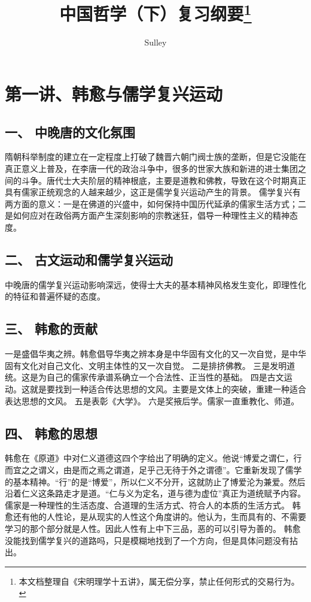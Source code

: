 \documentclass{article}
\title{\heiti 中国哲学（下）复习纲要\footnote{本文档整理自《宋明理学十五讲》，属无偿分享，禁止任何形式的交易行为。}}
\author{Sulley}
\date{}
\begin{document}
\maketitle
\tableofcontents
\newpage

\section{第一讲、韩愈与儒学复兴运动}
\subsection{一、	中晚唐的文化氛围}
隋朝科举制度的建立在一定程度上打破了魏晋六朝门阀士族的垄断，但是它没能在真正意义上普及，在李唐一代的政治斗争中，很多的世家大族和新进的进士集团之间的斗争。唐代士大夫阶层的精神根底，主要是道教和佛教，导致在这个时期真正具有儒家正统观念的人越来越少，这正是儒学复兴运动产生的背景。
儒学复兴有两方面的意义：一是在佛道的兴盛中，如何保持中国历代延承的儒家生活方式；二是如何应对在政俗两方面产生深刻影响的宗教迷狂，倡导一种理性主义的精神态度。
\subsection{二、	古文运动和儒学复兴运动}
中晚唐的儒学复兴运动影响深远，使得士大夫的基本精神风格发生变化，即理性化的特征和普遍怀疑的态度。
\subsection{三、	韩愈的贡献}
一是盛倡华夷之辨。韩愈倡导华夷之辨本身是中华固有文化的又一次自觉，是中华固有文化对自己文化、文明主体性的又一次自觉。
二是排挤佛教。
三是发明道统。这是为自己的儒家传承谱系确立一个合法性、正当性的基础。
四是古文运动。这就是要找到一种适合传达思想的文风。主要是文体上的突破，重建一种适合表达思想的文风。
五是表彰《大学》。
六是奖掖后学。儒家一直重教化、师道。
\subsection{四、	韩愈的思想}
韩愈在《原道》中对仁义道德这四个字给出了明确的定义。他说“博爱之谓仁，行而宜之之谓义，由是而之焉之谓道，足乎己无待于外之谓德”。它重新发现了儒学的基本精神。“行”的是“博爱”，所以仁义不分开，这就防止了博爱沦为兼爱。然后沿着仁义这条路走才是道。“仁与义为定名，道与德为虚位”真正为道统赋予内容。儒家是一种理性的生活态度、合道理的生活方式、符合人的本质的生活方式。
韩愈还有他的人性论，是从现实的人性这个角度讲的。他认为，生而具有的、不需要学习的那个部分就是人性。因此人性有上中下三品，恶的可以引导为善的。
韩愈没能找到儒学复兴的道路吗，只是模糊地找到了一个方向，但是具体问题没有拈出。
\end{document}
